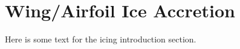 \section{Wing/Airfoil Ice Accretion}
\label{sec:introduction:icing}

Here is some text for the icing introduction section.
